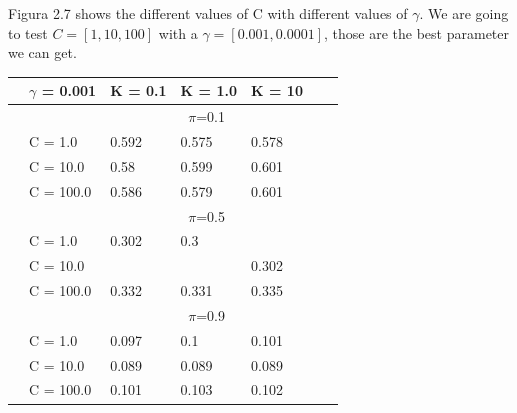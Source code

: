 \documentclass[english]{report}
\begin{document}
Figura 2.7 shows the different values of C with different values of $\gamma$. We are going to test
\(C = [1, 10, 100]\) with a \(\gamma = [0.001, 0.0001]\), those are the best parameter we can get.
\begin{table}[H]
    \centering
    
    \begin{tabular}{ll|lllll}
        \hline
                                & \textbf{$\gamma$ = 0.001} &         K = 0.1 & K = 1.0 & K = 10 \\ \hline
                                & & \multicolumn{3}{c}{$\pi$=0.1} \\ \hline
                                & C = 1.0    & 0.592 & 0.575 & 0.578    \\
                                & C = 10.0   & 0.58 & 0.599 & 0.601  \\
                                & C = 100.0   & 0.586 & 0.579 & 0.601  \\ \hline

                                & & \multicolumn{3}{c}{$\pi$=0.5} \\ \hline
                                & C = 1.0    & 0.302 & 0.3 & \color{red}{0.301}    \\
                                & C = 10.0   & \color{red}{0.293} & \color{red}{0.298} & 0.302  \\
                                & C = 100.0   & 0.332 & 0.331 & 0.335  \\ \hline

                                & & \multicolumn{3}{c}{$\pi$=0.9} \\ \hline
                                & C = 1.0    & 0.097 & 0.1 & 0.101    \\
                                & C = 10.0   & 0.089 & 0.089 & 0.089  \\
                                & C = 100.0   & 0.101 & 0.103 & 0.102  \\ 
    \hline
    \end{tabular}
\end{table}
\end{document}
